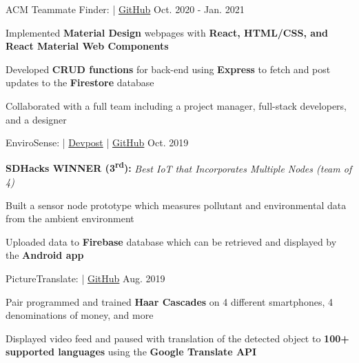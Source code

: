 

\begin{cventries}
	\cvproject
	{ACM Teammate Finder:  | \href{https://github.com/LelandTLong/ACM_Project}{\textcolor{awesome-skyblue}{\faGithub \enspace GitHub}}}
	{Oct. 2020 - Jan. 2021}
	{
		\begin{cvitems}
			\item Implemented \textbf{Material Design} webpages with \textbf{React, HTML/CSS, and React Material Web Components}
			\item Developed \textbf{CRUD functions} for back-end using \textbf{Express} to fetch and post updates to the \textbf{Firestore} database
		    \item Collaborated with a full team including a project manager, full-stack developers, and a designer
		\end{cvitems}
	}

	\cvproject
	{EnviroSense:  | \href{https://devpost.com/software/envirosense}{\textcolor{awesome-skyblue}{Devpost}} | \href{https://github.com/jerukan/EnviroSense}{\textcolor{awesome-skyblue}{\faGithub \enspace GitHub}}}
	{Oct. 2019}
	{
		\begin{cvitems}
			\item \textbf{SDHacks WINNER (3\textsuperscript{rd}):} \textit{Best IoT that Incorporates Multiple Nodes (team of 4)}
			\item Built a sensor node prototype which measures pollutant and environmental data from the ambient environment
			\item Uploaded data to \textbf{Firebase} database which can be retrieved and displayed by the \textbf{Android app}
		\end{cvitems}
	}

	\cvproject
	{PictureTranslate:  |  \href{https://github.com/ucsd-cse-spis-2019/project-tristin-caroline}{\textcolor{awesome-skyblue}{\faGithub \enspace GitHub}}}
	{Aug. 2019}
	{
		\begin{cvitems}
			\item Pair programmed and trained \textbf{Haar Cascades} on 4 different smartphones, 4 denominations of money, and more
			\item Displayed video feed and paused with translation of the detected object to \textbf{100+ supported languages} using the \textbf{Google Translate API}
		\end{cvitems}
	}
\end{cventries}